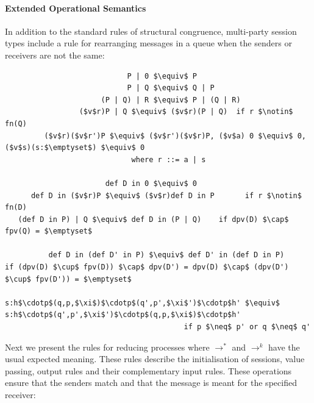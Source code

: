 \documentclass[11pt]{scrartcl}
\begin{document}
\paragraph{Extended Operational Semantics}
In addition to the standard rules of structural congruence, multi-party session
types include a rule for rearranging messages in a queue when the senders or
receivers are not the same:
\\

\begin{lstlisting}
                            P | 0 $\equiv$ P
                            P | Q $\equiv$ Q | P
                      (P | Q) | R $\equiv$ P | (Q | R)
                 ($v$r)P | Q $\equiv$ ($v$r)(P | Q)  if r $\notin$ fn(Q)
         ($v$r)($v$r')P $\equiv$ ($v$r')($v$r)P, ($v$a) 0 $\equiv$ 0, ($v$s)(s:$\emptyset$) $\equiv$ 0
                             where r ::= a | s

                       def D in 0 $\equiv$ 0
      def D in ($v$r)P $\equiv$ ($v$r)def D in P       if r $\notin$ fn(D)
   (def D in P) | Q $\equiv$ def D in (P | Q)    if dpv(D) $\cap$ fpv(Q) = $\emptyset$

          def D in (def D' in P) $\equiv$ def D' in (def D in P)
if (dpv(D) $\cup$ fpv(D)) $\cap$ dpv(D') = dpv(D) $\cap$ (dpv(D') $\cup$ fpv(D')) = $\emptyset$

s:h$\cdotp$(q,p,$\xi$)$\cdotp$(q',p',$\xi$')$\cdotp$h' $\equiv$ s:h$\cdotp$(q',p',$\xi$')$\cdotp$(q,p,$\xi$)$\cdotp$h'
                                         if p $\neq$ p' or q $\neq$ q'
\end{lstlisting}

Next we present the rules for reducing processes where $\rightarrow^*$ and 
$\rightarrow^k$ have the usual expected meaning. These rules describe the
initialisation of sessions, value passing, output rules and their complementary
input rules. These operations ensure that the senders match and that the message
is meant for the specified receiver:
\\
\end{document}
